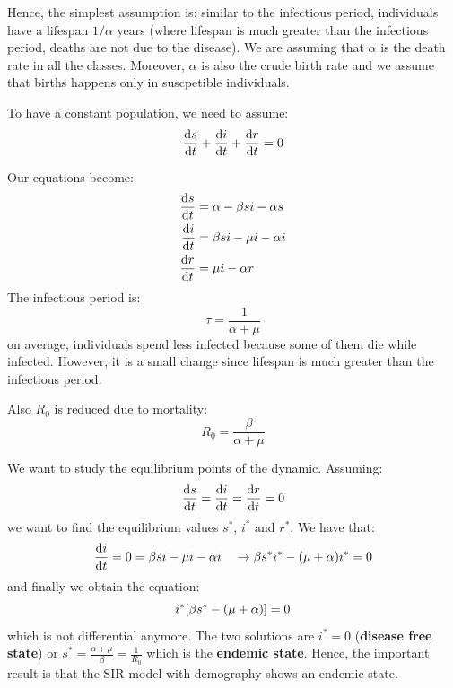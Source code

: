 \documentclass[../main/main.tex]{subfiles}
\begin{document}
Hence, the simplest assumption is: similar to the infectious period, individuals have a lifespan \( 1/\alpha  \) years (where lifespan is much greater than the infectious period, deaths are not due to the disease).
We are assuming that \( \alpha  \) is the death rate in all the classes. Moreover, \( \alpha  \) is also the crude birth rate and we assume that births happens only in suscpetible individuals.

To have a constant population, we need to assume:
\begin{equation}
  \dv{s}{t} + \dv{i}{t} + \dv{r}{t} = 0
\end{equation}

Our equations become:
\begin{equation}
\begin{split}
  \dv{s}{t} &= \alpha - \beta s i - \alpha s  \\
  \dv{i}{t} &= \beta s i - \mu i - \alpha i \\
  \dv{r}{t} &= \mu i - \alpha r
\end{split}
\end{equation}
The infectious period is:
\begin{equation}
  \tau = \frac{1}{\alpha + \mu }
\end{equation}
on average, individuals spend less infected because some of them die while infected. However, it is a small change since lifespan is much greater than the infectious period.

Also \( R_0 \) is reduced due to mortality:
\begin{equation}
  R_0 = \frac{\beta }{\alpha + \mu }
\end{equation}


We want to study the equilibrium points of the dynamic. Assuming:
\begin{equation*}
  \dv{s}{t} = \dv{i}{t} = \dv{r}{t} = 0
\end{equation*}
we want to find the equilibrium values  \( s^* \), \( i^* \) and \( r^* \).
We have that:
\begin{equation*}
  \dv{i}{t} = 0 = \beta s i - \mu i - \alpha i \quad \rightarrow   \beta s^* i^* - (\mu + \alpha ) i^* = 0
\end{equation*}
and finally we obtain the equation:
\begin{equation}
  i^* \qty[\beta s^* - (\mu + \alpha )] = 0
\end{equation}
which is not differential anymore.
The two solutions are \( i^* = 0 \) (\textbf{disease free state}) or \( s^* = \frac{\alpha + \mu }{\beta } = \frac{1}{R_0} \) which is the \textbf{endemic state}. Hence, the important result is that the SIR model with demography shows an endemic state.
\end{document}
